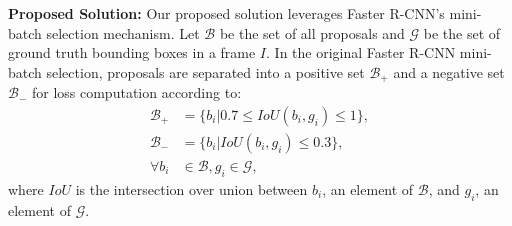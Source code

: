 \documentclass[10pt, conference, compsocconf]{IEEEtran}
\begin{document}
\begin{table*}[t]
\centering
{}
\caption{Comparison of the performance of our baselines and novel architectures on the Bosch and Tsinghua-Tencent datasets.}
\label{performance_table}
\end{table*}

\noindent\textbf{Proposed Solution:} Our proposed solution leverages Faster R-CNN's mini-batch selection mechanism. Let $\mathcal{B}$ be the set of all proposals and $\mathcal{G}$ be the set of ground truth bounding boxes in a frame $I$. In the original Faster R-CNN mini-batch selection, proposals are separated into a positive set $\mathcal{B}_{+}$ and a negative set $\mathcal{B}_{-}$ for loss computation according to:
\begin{equation}
\begin{aligned}
\mathcal{B}_{+} &= \{b_i| 0.7 \leq IoU(b_i,g_i) \leq 1\}, \\
\mathcal{B}_{-} &= \{b_i| IoU(b_i,g_i) \leq 0.3 \}, \\
\forall b_i& \in \mathcal{B}, g_i \in \mathcal{G}, 
\end{aligned}
\end{equation}
where $IoU$ is the intersection over union between $b_i$, an element of $\mathcal{B}$, and $g_i$, an element of $\mathcal{G}$. 
\end{document}

